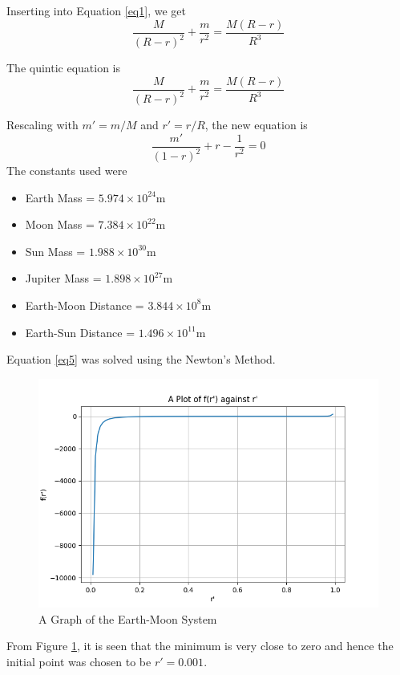 \documentclass[11pt]{article}
\begin{document}
Inserting into Equation \ref{eq1}, we get
\begin{equation}
	\frac{M}{(R-r)^{2}} + \frac{m}{r^{2}} =  \frac{M(R-r)}{R^{3}}
	\label{eq4}
\end{equation}

The quintic equation is 
\begin{equation}
	\frac{M}{(R-r)^{2}} + \frac{m}{r^{2}} =  \frac{M(R-r)}{R^{3}}
	\label{eq4}
\end{equation}

Rescaling with $m' = m/M$ and $r' = r/R$, the new equation is
\begin{equation}
	\frac{m'}{(1-r)^{2}} + r - \frac{1}{r^{2}} =  0
	\label{eq5}
\end{equation}
The constants used were
\begin{itemize}
	\item Earth Mass = $5.974\times10^{24} $m
	\item Moon Mass = $7.384 \times 10^{22}$m
	\item Sun Mass = $1.988\times10^{30}$m
	\item Jupiter Mass = $1.898\times10^{27}$m
	\item Earth-Moon Distance = $3.844\times10^8$m
	\item Earth-Sun Distance = $1.496\times10^{11}$m
\end{itemize}

Equation \ref{eq5} was solved using the Newton's Method.
\begin{figure}[!h]
	
	\centering
	\includegraphics[width=0.83\linewidth]{lagrange.png}
	\caption{A Graph of the Earth-Moon System}
	\label{fig:earth-moon}
	
\end{figure}
From Figure \ref{fig:earth-moon}, it is seen that the minimum is very close to zero and hence the initial point was chosen to be $r' = 0.001$.
\end{document}
